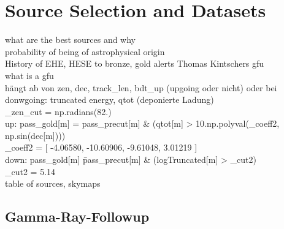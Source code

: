 \chapter{Source Selection and Datasets}
what are the best sources and why\\
probability of being of astrophysical origin\\
History of EHE, HESE to bronze, gold alerts Thomas Kintschers gfu\\
what is a gfu\\
hängt ab von zen, dec, track\_len, bdt\_up (upgoing oder nicht) oder bei donwgoing: truncated energy, qtot (deponierte Ladung)\\
\_zen\_cut = np.radians(82.)\\
up: pass\_gold[m]   = pass\_precut[m] \& (qtot[m] > 10.\*\*np.polyval(\_coeff2, np.sin(dec[m])))\\
\_coeff2 = [  -4.06580, -10.60906,  -9.61048,   3.01219 ]\\
down: pass\_gold[m]   \= pass\_precut[m] \& (logTruncated[m] > \_cut2)\\
\_cut2   = 5.14\\

table of sources, skymaps\\

\section{Gamma-Ray-Followup}
